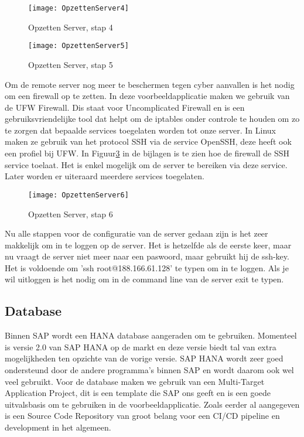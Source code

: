             \begin{figure}
                \centering
                \texttt{[image: OpzettenServer4]}
                \caption{Opzetten Server, stap 4} \label{OpzettenServer4}
            \end{figure}
        
            \begin{figure}
                \centering
                \texttt{[image: OpzettenServer5]}
                \caption{Opzetten Server, stap 5} \label{OpzettenServer5}
            \end{figure}
            
            Om de remote server nog meer te beschermen tegen cyber aanvallen is het nodig om een firewall op te zetten. In deze voorbeeldapplicatie maken we gebruik van de UFW Firewall. Dis staat voor Uncomplicated Firewall en is een gebruiksvriendelijke tool dat helpt om de iptables onder controle te houden om zo te zorgen dat bepaalde services toegelaten worden tot onze server.
            In Linux maken ze gebruik van het protocol SSH via de service OpenSSH, deze heeft ook een profiel bij UFW.
            In Figuur\ref{OpzettenServer6} in de bijlagen is te zien hoe de firewall de SSH service toelaat. Het is enkel mogelijk om de server te bereiken via deze service. Later worden er uiteraard meerdere services toegelaten.
            
            \begin{figure}
                \centering
                \texttt{[image: OpzettenServer6]}
                \caption{Opzetten Server, stap 6} \label{OpzettenServer6}
            \end{figure}
            
            Nu alle stappen voor de configuratie van de server gedaan zijn is het zeer makkelijk om in te loggen op de server.
            Het is hetzelfde als de eerste keer, maar nu vraagt de server niet meer naar een paswoord, maar gebruikt hij de ssh-key. Het is voldoende om 
            'ssh root@188.166.61.128' te typen om in te loggen.
            Als je wil uitloggen is het nodig om in de command line van de server exit te typen.
    
        \subsection{Database}
        Binnen SAP wordt een HANA database aangeraden om te gebruiken. Momenteel is versie 2.0 van SAP HANA op de markt en deze versie biedt tal van extra mogelijkheden ten opzichte van de vorige versie. SAP HANA wordt zeer goed ondersteund door de andere programma's binnen SAP en wordt daarom ook wel veel gebruikt.
        Voor de database maken we gebruik van een Multi-Target Application Project, dit is een template die SAP ons geeft en is een goede uitvalsbasis om te gebruiken in de voorbeeldapplicatie.
        Zoals eerder al aangegeven is een Source Code Repository van groot belang voor een CI/CD pipeline en development in het algemeen.
        
